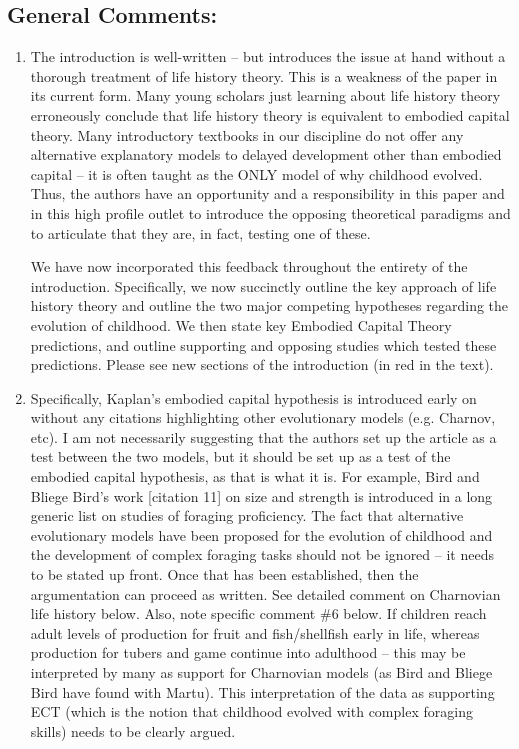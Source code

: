 \documentclass{article}
\newcommand{\rev}[1]{{\color{ForestGreen}#1}}
\begin{document}
\subsection{General Comments:}
\begin{enumerate}
    \item The introduction is well-written – but introduces the issue at hand without a thorough treatment of life history theory. This is a weakness of the paper in its current form. Many young scholars just learning about life history theory erroneously conclude that life history theory is equivalent to embodied capital theory. Many introductory textbooks in our discipline do not offer any alternative explanatory models to delayed development other than embodied capital – it is often taught as the ONLY model of why childhood evolved. Thus, the authors have an opportunity and a responsibility in this paper and in this high profile outlet to introduce the opposing theoretical paradigms and to articulate that they are, in fact, testing one of these.

\rev{We have now incorporated this feedback throughout the entirety of the introduction. Specifically, we now succinctly outline the key approach of life history theory and outline the two major competing hypotheses regarding the evolution of childhood. We then state key Embodied Capital Theory predictions, and outline supporting and opposing studies which tested these predictions. Please see new sections of the introduction (in red in the text). }

    \item Specifically, Kaplan’s embodied capital hypothesis is introduced early on without any citations highlighting other evolutionary models (e.g. Charnov, etc). I am not necessarily suggesting that the authors set up the article as a test between the two models, but it should be set up as a test of the embodied capital hypothesis, as that is what it is. For example, Bird and Bliege Bird’s work [citation 11] on size and strength is introduced in a long generic list on studies of foraging proficiency. The fact that alternative evolutionary models have been proposed for the evolution of childhood and the development of complex foraging tasks should not be ignored – it needs to be stated up front. Once that has been established, then the argumentation can proceed as written. See detailed comment on Charnovian life history below. Also, note specific comment \#6 below. If children reach adult levels of production for fruit and fish/shellfish early in life, whereas production for tubers and game continue into adulthood – this may be interpreted by many as support for Charnovian models (as Bird and Bliege Bird have found with Martu). This interpretation of the data as supporting ECT (which is the notion that childhood evolved with complex foraging skills) needs to be clearly argued.


\end{enumerate}
\end{document}
